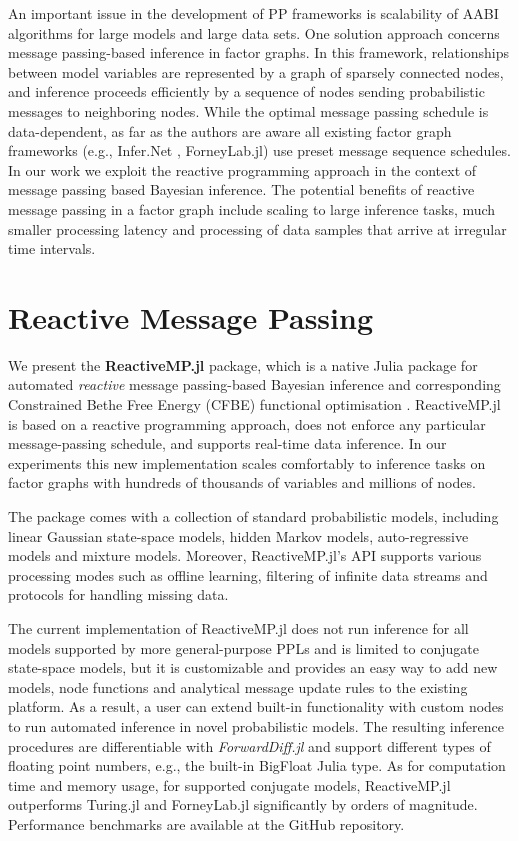 \documentclass{juliacon}
\begin{document}
An important issue in the development of PP frameworks is scalability of AABI algorithms for large models and large data sets. 
One solution approach concerns message passing-based inference in factor graphs. In this framework, relationships between model variables are represented by a graph of sparsely connected nodes, 
and inference proceeds efficiently by a sequence of nodes sending probabilistic messages to neighboring nodes. While the optimal message passing schedule is data-dependent, as far as the authors are aware
all existing factor graph frameworks (e.g., Infer.Net \cite{InferNET18}, ForneyLab.jl) use preset message sequence schedules. In our work we exploit the reactive programming approach in the context of message passing 
based Bayesian inference. The potential benefits of reactive message passing in a factor graph include scaling to large inference tasks, much smaller processing latency and processing of data samples that arrive at irregular time intervals.

\section{Reactive Message Passing}

We present the \textbf{ReactiveMP.jl} package, which is a native Julia \cite{bezanson2017julia} package for automated \textit{reactive} message passing-based Bayesian inference and corresponding
Constrained Bethe Free Energy (CFBE) functional optimisation \cite{senoz_local_constraint_2021}. ReactiveMP.jl is based on a reactive programming approach, does not enforce any particular message-passing schedule, and supports real-time data inference. 
In our experiments this new implementation scales comfortably to inference tasks on factor graphs with hundreds of thousands of variables and millions of nodes.

The package comes with a collection of standard probabilistic models, including linear Gaussian state-space models, hidden Markov models, auto-regressive models and mixture models. 
Moreover, ReactiveMP.jl's API supports various processing modes such as offline learning, filtering of infinite data streams and protocols for handling missing data.

The current implementation of ReactiveMP.jl does not run inference for all models supported by more general-purpose PPLs and is limited to conjugate state-space models, but it is customizable and provides an easy way to add new models, node functions and analytical message update rules to the existing platform. 
As a result, a user can extend built-in functionality with custom nodes to run automated inference in novel probabilistic models.
The resulting inference procedures are differentiable with \textit{ForwardDiff.jl} \cite{RevelsLubinPapamarkou2016} and support different types of floating point numbers, e.g., the built-in BigFloat Julia type.
As for computation time and memory usage, for supported conjugate models, ReactiveMP.jl outperforms Turing.jl and ForneyLab.jl significantly by orders of magnitude. Performance benchmarks are available at the GitHub repository.
\end{document}
